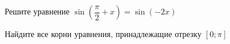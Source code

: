 \begin{ex}
	\begin{condition}
		\begin{enumcols}[label=\asbuk*)]
			\item Решите уравнение \( \sin {\left(\dfrac{\pi}{2}+x\right)} = \sin (-2x) \)
			\item Найдите все корни уравнения, принадлежащие отрезку \( \left[0;\pi\right] \)
		\end{enumcols}
	\end{condition}
\end{ex}